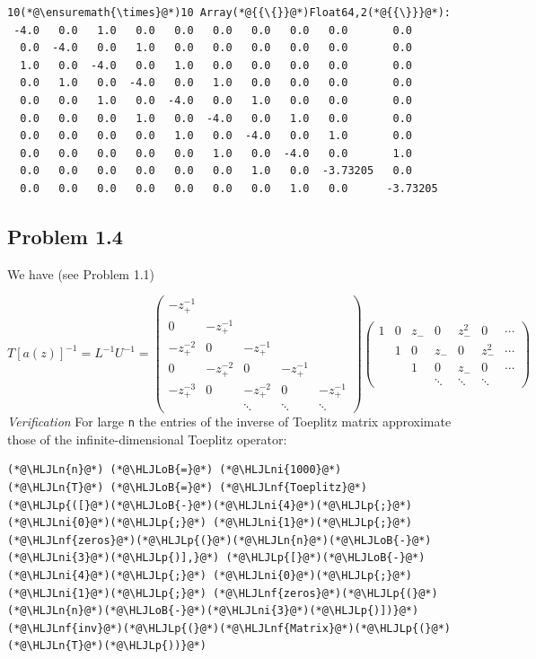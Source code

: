 \documentclass[12pt,a4paper]{article}
\newcommand{\HLJLn}[1]{#1}
\newcommand{\HLJLnf}[1]{\textcolor[RGB]{66,102,213}{#1}}
\newcommand{\HLJLni}[1]{\textcolor[RGB]{59,151,46}{#1}}
\newcommand{\HLJLoB}[1]{\textcolor[RGB]{102,102,102}{\textbf{#1}}}
\newcommand{\HLJLp}[1]{#1}
\def\sopmatrix#1{ \begin{pmatrix}#1\end{pmatrix} }
\begin{document}
\begin{lstlisting}
10(*@\ensuremath{\times}@*)10 Array(*@{{\{}}@*)Float64,2(*@{{\}}}@*):
 -4.0   0.0   1.0   0.0   0.0   0.0   0.0   0.0   0.0       0.0
  0.0  -4.0   0.0   1.0   0.0   0.0   0.0   0.0   0.0       0.0
  1.0   0.0  -4.0   0.0   1.0   0.0   0.0   0.0   0.0       0.0
  0.0   1.0   0.0  -4.0   0.0   1.0   0.0   0.0   0.0       0.0
  0.0   0.0   1.0   0.0  -4.0   0.0   1.0   0.0   0.0       0.0
  0.0   0.0   0.0   1.0   0.0  -4.0   0.0   1.0   0.0       0.0
  0.0   0.0   0.0   0.0   1.0   0.0  -4.0   0.0   1.0       0.0
  0.0   0.0   0.0   0.0   0.0   1.0   0.0  -4.0   0.0       1.0
  0.0   0.0   0.0   0.0   0.0   0.0   1.0   0.0  -3.73205   0.0
  0.0   0.0   0.0   0.0   0.0   0.0   0.0   1.0   0.0      -3.73205
\end{lstlisting}


\subsection{Problem 1.4}
We have (see Problem 1.1)

\[
T[a(z)]^{-1} = L^{-1} U^{-1} = 
\sopmatrix{-z_+^{-1} \\
0 & -z_+^{-1} \\
-z_+^{-2} & 0 & -z_+^{-1} \\
0 & -z_+^{-2} & 0 & -z_+^{-1} \\
-z_+^{-3} & 0 & -z_+^{-2} & 0 & -z_+^{-1} \\
&&\ddots & \ddots & \ddots
}
\sopmatrix{
1 & 0 & z_- & 0 &z_-^2 & 0 & \cdots \\
& 1 & 0 & z_- & 0 &z_-^2 & \cdots \\
& & 1 & 0 & z_- & 0 & \cdots \\
&&&\ddots & \ddots & \ddots 
}
\]
\emph{Verification} For large \texttt{n} the entries of the inverse of Toeplitz matrix approximate those of the infinite-dimensional Toeplitz operator:


\begin{lstlisting}
(*@\HLJLn{n}@*) (*@\HLJLoB{=}@*) (*@\HLJLni{1000}@*)
(*@\HLJLn{T}@*) (*@\HLJLoB{=}@*) (*@\HLJLnf{Toeplitz}@*)(*@\HLJLp{([}@*)(*@\HLJLoB{-}@*)(*@\HLJLni{4}@*)(*@\HLJLp{;}@*) (*@\HLJLni{0}@*)(*@\HLJLp{;}@*) (*@\HLJLni{1}@*)(*@\HLJLp{;}@*) (*@\HLJLnf{zeros}@*)(*@\HLJLp{(}@*)(*@\HLJLn{n}@*)(*@\HLJLoB{-}@*)(*@\HLJLni{3}@*)(*@\HLJLp{)],}@*) (*@\HLJLp{[}@*)(*@\HLJLoB{-}@*)(*@\HLJLni{4}@*)(*@\HLJLp{;}@*) (*@\HLJLni{0}@*)(*@\HLJLp{;}@*) (*@\HLJLni{1}@*)(*@\HLJLp{;}@*) (*@\HLJLnf{zeros}@*)(*@\HLJLp{(}@*)(*@\HLJLn{n}@*)(*@\HLJLoB{-}@*)(*@\HLJLni{3}@*)(*@\HLJLp{)])}@*)
(*@\HLJLnf{inv}@*)(*@\HLJLp{(}@*)(*@\HLJLnf{Matrix}@*)(*@\HLJLp{(}@*)(*@\HLJLn{T}@*)(*@\HLJLp{))}@*)
\end{lstlisting}
\end{document}
